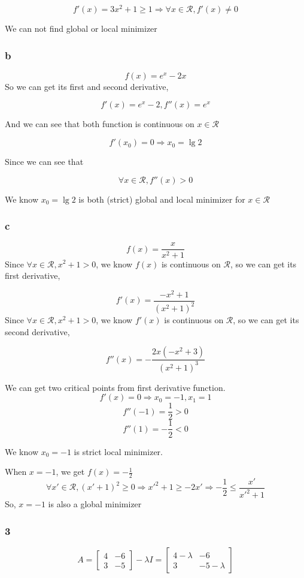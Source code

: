 \documentclass{article}
\def\implies{\Longrightarrow}
\begin{document}
$$f'(x) = 3x^2 + 1 \ge 1 \implies \forall x \in \mathcal{R}, f'(x) \ne 0$$

We can not find global or local minimizer

\subsubsection*{b}
$$f(x) = e^x - 2x$$
So we can get its first and second derivative,

$$f'(x) = e^x - 2, f''(x) = e^x$$

And we can see that both function is continuous on $x \in \mathcal{R}$

$$f'(x_0) = 0 \implies x_0 = \lg2$$

Since we can see that

$$\forall x \in \mathcal{R}, f''(x) > 0 $$

We know $x_0 = \lg 2$ is both (strict) global and local minimizer for $x \in \mathcal{R}$

\subsubsection*{c}
$$f(x) = \frac{x}{x^2 + 1}$$
Since $\forall x \in \mathcal{R}, x^2 + 1 > 0$, we know $f(x)$ is continuous on $\mathcal{R}$, so we can get its first derivative,


$$f'(x) = \frac{-x^2+1}{\left(x^2+1\right)^2}$$
Since $\forall x \in \mathcal{R}, x^2 + 1 > 0$, we know $f'(x)$ is continuous on $\mathcal{R}$, so we can get its second derivative,

$$f''(x) = -\frac{2x\left(-x^2+3\right)}{\left(x^2+1\right)^3}$$



We can get two critical points from first derivative function.
$$f'(x) = 0 \implies x_0 = -1, x_1 = 1$$
$$f''(-1) = \frac{1}{2} > 0$$
$$f''(1) = -\frac{1}{2} < 0$$

We know $x_0 = -1$ is strict local minimizer.

When $x = -1$, we get $f(x) = -\frac{1}{2}$
$$\forall x' \in \mathcal{R}, (x' + 1)^2 \ge 0 \implies x'^2 + 1 \ge -2x'\implies-\frac{1}{2} \le \frac{x'}{ x'^2 + 1}$$
So, $x = -1$ is also a global minimizer



\subsubsection*{3}
$$A = \begin{bmatrix}
4 & -6 \\
3 & -5
\end{bmatrix} - \lambda I = 
\begin{bmatrix}
4 - \lambda& -6 \\
3 & -5 - \lambda
\end{bmatrix}
$$
\end{document}
